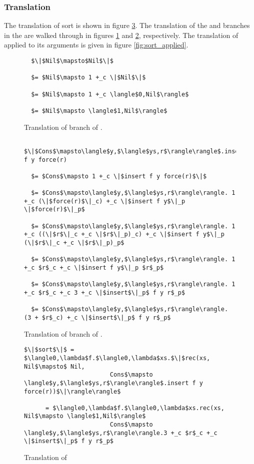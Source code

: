 \subsubsection{Translation}
The translation of sort is shown in figure \ref{fig:sort}.  The translation of
the  and  branches in the  are walked through in figures
\ref{fig:sort_nil} and \ref{fig:sort_cons}, respectively.  The translation of
 applied to its arguments is given in figure \ref{fig:sort_applied}.
%
\begin{figure}[H]
  \caption{Translation of  branch of .}
  \label{fig:sort_nil}
  \begin{lstlisting}
  $\|$Nil$\mapsto$Nil$\|$

  $= $Nil$\mapsto 1 +_c \|$Nil$\|$

  $= $Nil$\mapsto 1 +_c \langle$0,Nil$\rangle$

  $= $Nil$\mapsto \langle$1,Nil$\rangle$
  \end{lstlisting}
\end{figure}
%
\begin{figure}[H]
  \caption{Translation of  branch of .}
  \label{fig:sort_cons}
  \begin{lstlisting}
  $\|$Cons$\mapsto\langle$y,$\langle$ys,r$\rangle\rangle$.insert f y force(r)

  $= $Cons$\mapsto 1 +_c \|$insert f y force(r)$\|$

  $= $Cons$\mapsto\langle$y,$\langle$ys,r$\rangle\rangle. 1 +_c (\|$force(r)$\|_c) +_c \|$insert f y$\|_p \|$force(r)$\|_p$

  $= $Cons$\mapsto\langle$y,$\langle$ys,r$\rangle\rangle. 1 +_c ((\|$r$\|_c +_c \|$r$\|_p)_c) +_c \|$insert f y$\|_p (\|$r$\|_c +_c \|$r$\|_p)_p$

  $= $Cons$\mapsto\langle$y,$\langle$ys,r$\rangle\rangle. 1 +_c $r$_c +_c \|$insert f y$\|_p $r$_p$

  $= $Cons$\mapsto\langle$y,$\langle$ys,r$\rangle\rangle. 1 +_c $r$_c +_c 3 +_c \|$insert$\|_p$ f y r$_p$

  $= $Cons$\mapsto\langle$y,$\langle$ys,r$\rangle\rangle. (3 + $r$_c) +_c \|$insert$\|_p$ f y r$_p$

  \end{lstlisting}
\end{figure}
%
\begin{figure}[H]
\caption{Translation of }
\label{fig:sort}
\begin{lstlisting}
$\|$sort$\|$ = $\langle0,\lambda$f.$\langle0,\lambda$xs.$\|$rec(xs, Nil$\mapsto$ Nil,
                        Cons$\mapsto \langle$y,$\langle$ys,r$\rangle\rangle$.insert f y force(r))$\|\rangle\rangle$

      = $\langle0,\lambda$f.$\langle0,\lambda$xs.rec(xs, Nil$\mapsto \langle$1,Nil$\rangle$
                        Cons$\mapsto \langle$y,$\langle$ys,r$\rangle\rangle.3 +_c $r$_c +_c \|$insert$\|_p$ f y r$_p$
\end{lstlisting}
\end{figure}

